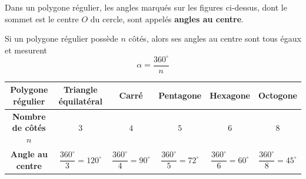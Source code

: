 \begin{center}
\end{center}

\begin{defin}
	Dans un polygone régulier, les angles marqués sur les figures ci-dessus, dont le sommet est le centre $O$ du cercle, sont appelés \textbf{angles au centre}.
\end{defin}

\begin{prop}
	Si un polygone régulier possède $n$ côtés, alors ses angles au centre sont tous égaux et mesurent
	\[
		\alpha = \dfrac{360^\circ}{n}
	\]
\end{prop}

\begin{ex}
	\nline
	\begin{center}
		\small
		\begin{tabular}{|c|c|c|c|c|c|} \hline
			\ccg \textbf{Polygone régulier}                     & Triangle équilatéral             & Carré                           & Pentagone                       & Hexagone                        & Octogone                        \\ \hline
			\ccg \textbf{Nombre de côtés} $n$                   & $3$                              & $4$                             & $5$                             & $6$                             & $8$                             \\ \hline
			\ccg\rule[-4mm]{0mm}{11mm} \textbf{Angle au centre} & $\dfrac{360^\circ}{3}=120^\circ$ & $\dfrac{360^\circ}{4}=90^\circ$ & $\dfrac{360^\circ}{5}=72^\circ$ & $\dfrac{360^\circ}{6}=60^\circ$ & $\dfrac{360^\circ}{8}=45^\circ$ \\ \hline
		\end{tabular}
	\end{center}
\end{ex}

